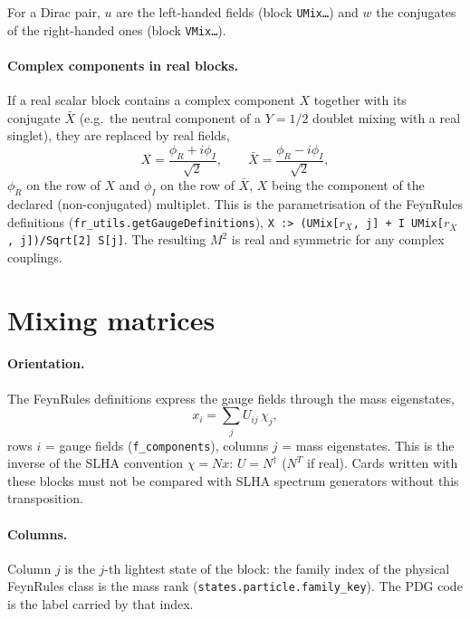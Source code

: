 \documentclass[11pt]{article}
\newcommand{\code}[1]{\texttt{#1}}
\begin{document}
\noindent For a Dirac pair, $u$ are the left-handed fields (block \code{UMix\ldots}) and $w$ the
conjugates of the right-handed ones (block \code{VMix\ldots}).

\paragraph{Complex components in real blocks.} If a real scalar block contains a complex
component $X$ together with its conjugate $\bar X$ (e.g.\ the neutral component of a
$Y=1/2$ doublet mixing with a real singlet), they are replaced by real fields,
\begin{equation}
  X = \frac{\phi_R + i\phi_I}{\sqrt2},\qquad \bar X = \frac{\phi_R - i\phi_I}{\sqrt2},
\end{equation}
$\phi_R$ on the row of $X$ and $\phi_I$ on the row of $\bar X$, $X$ being the component of
the declared (non-conjugated) multiplet. This is the parametrisation of the FeynRules
definitions (\code{fr\_utils.getGaugeDefinitions}),
\code{X :> (UMix[$r_X$, j] + I UMix[$r_{\bar X}$, j])/Sqrt[2] S[j]}. The resulting $M^2$ is
real and symmetric for any complex couplings.

\section{Mixing matrices}

\paragraph{Orientation.} The FeynRules definitions express the gauge fields through the
mass eigenstates,
\begin{equation}
  x_i = \sum_j U_{ij}\, \chi_j ,
\end{equation}
rows $i$ = gauge fields (\code{f\_components}), columns $j$ = mass eigenstates. This is the
inverse of the SLHA convention $\chi = N x$: $U = N^\dagger$ ($N^T$ if real). Cards written
with these blocks must not be compared with SLHA spectrum generators without this
transposition.

\paragraph{Columns.} Column $j$ is the $j$-th lightest state of the block: the family index of
the physical FeynRules class is the mass rank (\code{states.particle.family\_key}). The PDG
code is the label carried by that index.
\end{document}
